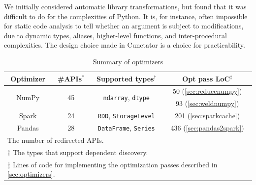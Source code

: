 \documentclass[sigconf]{acmart}\settopmatter{printfolios=true,printccs=false,printacmref=false}\setcopyright{none}
\begin{document}
We initially considered automatic library transformations, but found that it was difficult to do for the complexities of Python. It is, for instance, often impossible for static code analysis to tell whether an argument is subject to modifications, due to dynamic types, aliases, higher-level functions, and inter-procedural complexities. The design choice made in Cunctator is a choice for practicability.




\begin{table}[htbp]
    \centering
    \caption{Summary of optimizers}
    \begin{tabular}{c c c c}
         \textbf{Optimizer} &  \textbf{\#APIs}$^*$ & \textbf{Supported types}$^\dagger$ & \textbf{Opt pass LoC}$^\ddagger$\\
    \toprule
         \multirow{2}{*}{NumPy} & \multirow{2}{*}{45} & \multirow{2}{*}{\texttt{ndarray}, \texttt{dtype}}& 50 (\cref{sec:reducenumpy})\\
          & & & 93 (\cref{sec:weldnumpy})\\
          \hline
         Spark & 24 & \texttt{RDD}, \texttt{StorageLevel} & 201 (\cref{sec:sparkcache}) \\
         \hline
         Pandas & 28 & \texttt{DataFrame}, \texttt{Series} & 436 (\cref{sec:pandas2spark}) \\
    \multicolumn{4}{l}{\footnotesize * The number of redirected APIs.} \\
    \multicolumn{4}{l}{\footnotesize $\dagger$ The types that support dependent discovery.} \\
    \multicolumn{4}{l}{\footnotesize $\ddagger$ Lines of code for implementing the optimization passes described in \cref{sec:optimizers}.}
    \end{tabular}
    \label{tab:optimizers}
\end{table}
\end{document}

